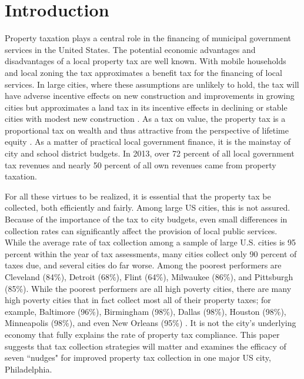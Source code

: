 \documentclass[12pt]{article}
\begin{document}
\newpage

\section{Introduction}

Property taxation plays a central role in the financing of municipal
government services in the United States.  The potential economic
advantages and disadvantages of a local property tax are well known.
With mobile households and local zoning the tax approximates a benefit
tax for the financing of local services.  In large cities, where these
assumptions are unlikely to hold, the tax will have adverse incentive
effects on new construction and improvements in growing cities but
approximates a land tax in its incentive effects in declining or
stable cities with modest new construction \cite{Aaron-75}.  As a tax
on value, the property tax is a proportional tax on wealth and thus
attractive from the perspective of lifetime equity
\cite{Mieszkowski-72}.  As a matter of practical local government
finance, it is the mainstay of city and school district budgets.  In
2013, over 72 percent of all local government tax revenues and nearly
50 percent of all own revenues came from property taxation.

For all these virtues to be realized, it is essential that the
property tax be collected, both efficiently and fairly.  Among large
US cities, this is not assured.  Because of the importance of the tax
to city budgets, even small differences in collection rates can
significantly affect the provision of local public services. While the
average rate of tax collection among a sample of large U.S. cities is
95 percent within the year of tax assessments, many cities collect
only 90 percent of taxes due, and several cities do far worse.  Among
the poorest performers are Cleveland (84\%), Detroit (68\%), Flint
(64\%), Milwaukee (86\%), and Pittsburgh (85\%). While the poorest
performers are all high poverty cities, there are many high poverty
cities that in fact collect most all of their property taxes; for
example, Baltimore (96\%), Birmingham (98\%), Dallas (98\%), Houston
(98\%), Minneapolis (98\%), and even New Orleans (95\%)
\cite{CILMS-16}.  It is not the city's underlying economy that fully
explains the rate of property tax compliance.  This paper suggests
that tax collection strategies will matter and examines the efficacy
of seven ``nudges" for improved property tax collection in one major
US city, Philadelphia.
\end{document}
